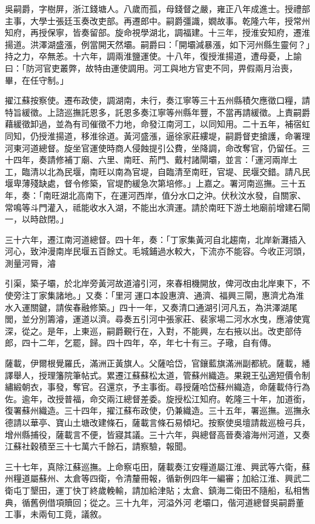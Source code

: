 \begin{pinyinscope}
吳嗣爵，字樹屏，浙江錢塘人。八歲而孤，母錢督之嚴，雍正八年成進士。授禮部主事，大學士張廷玉奏改吏部。再遷郎中。嗣爵彊識，嫺故事。乾隆六年，授常州知府，再授保寧，皆奏留部。旋命視學湖北，調福建。十三年，授淮安知府，遷淮揚道。洪澤湖盛漲，例當開天然壩。嗣爵曰：「開壩減暴漲，如下河州縣生靈何？」持之力，卒無恙。十六年，調兩淮鹽運使。十八年，復授淮揚道，遭母憂，上諭曰：「防河官吏叢弊，故特由運使調用。河工與地方官吏不同，畀假兩月治喪，畢，在任守制。」

擢江蘇按察使。遷布政使，調湖南，未行，奏江寧等三十五州縣積欠應徵口糧，請特旨緩徵。上諮巡撫託恩多，託恩多奏江寧等州縣年豐，不當再請緩徵。上責嗣爵藉緩徵卸過，並為有司催徵不力地，命發江南河工，以同知用。二十五年，補宿虹同知，仍授淮揚道，移淮徐道。黃河盛漲，逼徐家莊縷堤，嗣爵督吏搶護，命署理河東河道總督。旋坐官運使時商人侵蝕提引公費，坐降調，命改奪官，仍留任。三十四年，奏請修補丁廟、六里、南旺、荊門、戴村諸閘壩，並言：「運河兩岸土工，臨清以北為民堰，南旺以南為官堤，自臨清至南旺，官堤、民堰交錯。請凡民堰卑薄殘缺處，督令修築，官堤酌緩急次第培修。」上嘉之。署河南巡撫。三十五年，奏：「南旺湖北高南下，在運河西岸，值分水口之沖。伏秋汶水發，自關家、常鳴等斗門灌入，祗能收水入湖，不能出水濟運。請於南旺下游土地廟前增建石閘一，以時啟閉。」

三十六年，遷江南河道總督。四十年，奏：「丁家集黃河自北趨南，北岸新灘插入河心，致沖漫南岸民堰五百餘丈。毛城鋪過水較大，下流亦不能容。今收正河頭，測量河脣，濬

引渠，築子壩，於北岸旁黃河故道濬引河，來春相機開放，俾河改由北岸東下，不使旁注丁家集諸地。」又奏：「里河運口本設惠濟、通濟、福興三閘，惠濟尤為淮水入運關鍵，請俟春融修築。」四十一年，又奏清口通湖引河凡五，為洪澤湖尾閭，並分別籌濬，運道以濟。尋奏五引河中張家莊、裴家場二河水水曳，應濬使寬深，從之。是年，上東巡，嗣爵覲行在，入對，不能興，左右掖以出。改吏部侍郎，四十二年，乞罷，歸。四十四年，卒，年七十有三。子璥，自有傳。

薩載，伊爾根覺羅氏，滿洲正黃旗人。父薩哈岱，官鑲藍旗滿洲副都統。薩載，繙譯舉人，授理籓院筆帖式。累遷江蘇蘇松太道，管蘇州織造。果親王弘適短價令制繡緞朝衣，事發，奪官。召還京，予主事銜。尋授薩哈岱蘇州織造，命薩載侍行為佐。逾年，改授普福，命交兩江總督差委。旋授松江知府。乾隆三十年，加道銜，復署蘇州織造。三十四年，擢江蘇布政使，仍兼織造。三十五年，署巡撫。巡撫永德請以華亭、寶山土塘改建條石，薩載言條石易傾圮。按察使吳壇請裁巡檢弓兵，增州縣捕役，薩載言不便，皆寢其議。三十六年，與總督高晉奏濬海州河道，又奏江蘇社穀積至三十七萬六千餘石，請察驗，報聞。

三十七年，真除江蘇巡撫。上命察屯田，薩載奏江安糧道屬江淮、興武等六衛，蘇州糧道屬蘇州、太倉等四衛，令清釐冊報，循新例四年一編審；加給江淮、興武二衛屯丁墾田，運丁快丁終歲輓輸，請加給津貼；太倉、鎮海二衛田不隨船，私相售典，循舊例借項贖回；從之。三十九年，河溢外河老壩口，偕河道總督吳嗣爵董工事，未兩旬工竟，議敘。


\end{pinyinscope}
